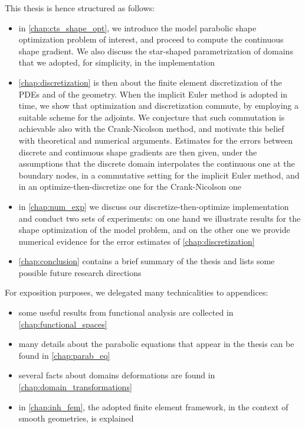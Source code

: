 \documentclass[english,a4paper,9pt,oneside]{scrbook}	%
\theoremstyle{break}
\theoremstyle{remark}
\begin{document}
This thesis is hence structured as follows:

\begin{itemize}
	\item in \cref{chap:cts_shape_opt}, we introduce the model parabolic shape optimization problem of interest, and proceed to compute the continuous shape gradient. We also discuss the star-shaped parametrization of domains that we adopted, for simplicity, in the implementation
	\item \cref{chap:discretization} is then about the finite element discretization of the PDEs and of the geometry. When the implicit Euler method is adopted in time, we show that optimization and discretization commute, by employing a suitable scheme for the adjoints. We conjecture that such commutation is achievable also with the Crank-Nicolson method, and motivate this belief with theoretical and numerical arguments. Estimates for the errors between discrete and continuous shape gradients are then given, under the assumptions that the discrete domain interpolates the continuous one at the boundary nodes, in a commutative setting for the implicit Euler method, and in an optimize-then-discretize one for the Crank-Nicolson one 
	\item in \cref{chap:num_exp} we discuss our discretize-then-optimize implementation and conduct two sets of experiments: on one hand we illustrate results for the shape optimization of the model problem, and on the other one we provide numerical evidence for the error estimates of \cref{chap:discretization}
	\item \cref{chap:conclusion} contains a brief summary of the thesis and lists some possible future research directions
\end{itemize}

For exposition purposes, we delegated many technicalities to appendices:

\begin{itemize}
	\item some useful results from functional analysis are collected in \cref{chap:functional_spaces}
	\item many details about the parabolic equations that appear in the thesis can be found in \cref{chap:parab_eq}
	\item several facts about domains deformations are found in \cref{chap:domain_transformations}
	\item in \cref{chap:inh_fem}, the adopted finite element framework, in the context of smooth geometries, is explained
\end{itemize}
\end{document}
